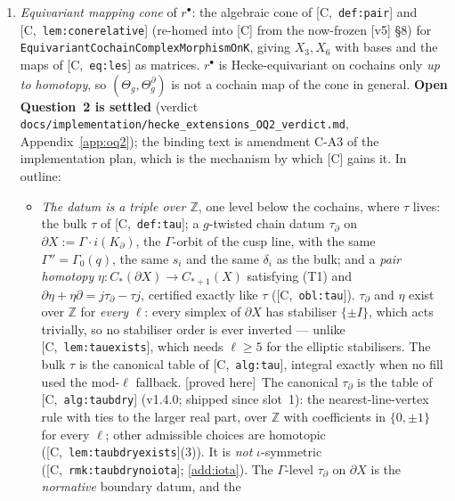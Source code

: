 \documentclass[11pt]{article}
\theoremstyle{remark}
\newcommand{\Z}{\mathbb{Z}}
\newcommand{\Ga}{\Gamma}
\newcommand{\HA}[1]{[C,~\texttt{#1}]}      %
\newcommand{\PROVED}{\textsf{[proved here]}}
\begin{document}
\begin{enumerate}[label=(A\arabic*)]
  breaks it on $H^1$ exactly when $\chi_0(p)\ne\chi_1(p)$ (\HA{cl:chi}(3)), which on $H^0$ of
  the circle model it cannot. The Eisenstein eigenvalue $1+q^{n+1}$ on $[y^n]\in X_5$, read in
  the coordinate $\Phi$, is the oracle.
\item\label{add:cone} \emph{Equivariant mapping cone} of $r^\bullet$: the algebraic cone of
  \HA{def:pair} and \HA{lem:conerelative} (re-homed into [C] from the now-frozen [v5] \S8) for
  \texttt{Equivariant\allowbreak Cochain\allowbreak Complex\allowbreak Morphism\allowbreak OnK}, giving $X_3,X_6$ with bases and the maps of
  \HA{eq:les} as matrices. $r^\bullet$ is Hecke-equivariant on cochains only \emph{up to
  homotopy}, so $(\Theta_g,\Theta_g^\partial)$ is not a cochain map of the cone in general.
  \textbf{Open Question~2 is settled} (verdict
  \texttt{docs/implementation/\allowbreak hecke\_extensions\_\allowbreak OQ2\_\allowbreak verdict.md},
  Appendix~\ref{app:oq2}); the binding text is amendment C-A3 of the implementation plan, which is
  the mechanism by which [C] gains it. In outline:
  \begin{itemize}
  \item \emph{The datum is a triple over $\Z$}, one level below the cochains, where $\tau$ lives:
    the bulk $\tau$ of \HA{def:tau}; a $g$-twisted chain datum $\tau_\partial$ on
    $\partial X:=\Ga\cdot i(K_\partial)$, the $\Ga$-orbit of the cusp line, with the same
    $\Ga''=\Ga_0(q)$, the same $s_i$ and the same $\delta_i$ as the bulk; and a \emph{pair homotopy}
    $\eta:C_\ast(\partial X)\to C_{\ast+1}(X)$ satisfying (T1) and
    $\partial\eta+\eta\partial=j\tau_\partial-\tau j$, certified exactly like $\tau$ (\HA{obl:tau}).
    $\tau_\partial$ and $\eta$ exist over $\Z$ for \emph{every} $\ell$: every simplex of
    $\partial X$ has stabiliser $\{\pm I\}$, which acts trivially, so no stabiliser order is ever
    inverted --- unlike \HA{lem:tauexists}, which needs $\ell\ge5$ for the elliptic stabilisers.
    The bulk $\tau$ is the canonical table of \HA{alg:tau}, integral exactly when no fill used the
    mod-$\ell$ fallback. \PROVED\
    The canonical $\tau_\partial$ is the table of \HA{alg:taubdry} (v1.4.0; shipped since
    slot~1): the nearest-line-vertex rule with ties to the larger real part, over $\Z$ with
    coefficients in $\{0,\pm1\}$ for every $\ell$; other admissible choices are homotopic
    (\HA{lem:taubdryexists}(3)). It is \emph{not} $\iota$-symmetric (\HA{rmk:taubdrynoiota};
    \ref{add:iota}).
    The $\Ga$-level $\tau_\partial$ on $\partial X$ is the \emph{normative} boundary datum, and the

\end{itemize}
\end{enumerate}
\end{document}

